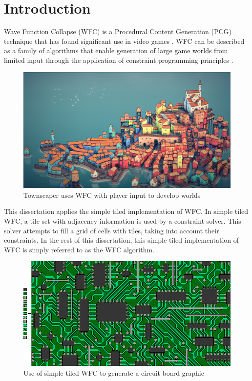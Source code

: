 \chapter{Introduction}
Wave Function Collapse (WFC) is a Procedural Content Generation (PCG) technique that has found significant use in video games \cite{Gumin_Wave_Function_Collapse_2016}. WFC can be described as a family of algorithms that enable generation of large game worlds from limited input through the application of constraint programming principles \cite{WFC_ConstraintSolving_and_ML}.

\begin{figure}[H]
        \centering
        \includegraphics[width=\textwidth, height=0.3\textheight, keepaspectratio]{Images/Townscaper.png}
        \caption{Townscaper uses WFC with player input to develop worlds \cite{townscaper}}
        \label{fig:townscaper}
\end{figure}

This dissertation applies the simple tiled implementation of WFC. In simple tiled WFC, a tile set with adjacency information is used by a constraint solver. This solver attempts to fill a grid of cells with tiles, taking into account their constraints. In the rest of this dissertation, this simple tiled implementation of WFC is simply referred to as the WFC algorithm.

\begin{figure}[H]
        \centering
        \includegraphics[width=\textwidth, height=0.3\textheight, keepaspectratio]{Images/circuit-1.png}
        \caption{Use of simple tiled WFC to generate a circuit board graphic \cite{Gumin_Wave_Function_Collapse_2016}}
        \label{fig:WFCcircuit}
\end{figure}

